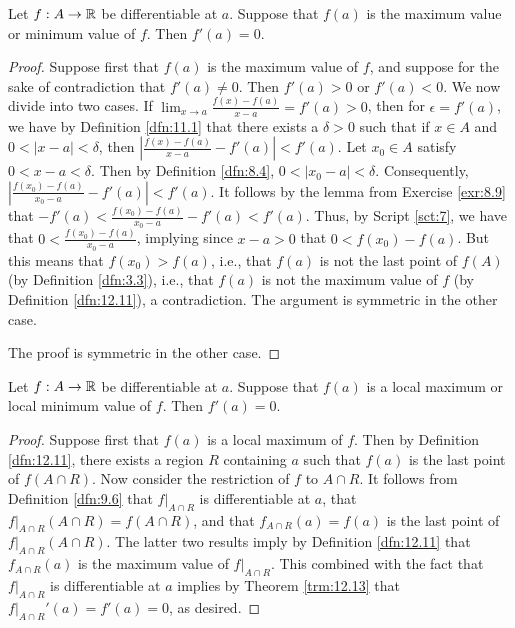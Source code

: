 \documentclass[../main.tex]{subfiles}
\begin{document}
\begin{theorem}\label{trm:12.13}
    Let $f:A\to\mathbb{R}$ be differentiable at $a$. Suppose that $f(a)$ is the maximum value or minimum value of $f$. Then $f'(a)=0$.
    \begin{proof}
        Suppose first that $f(a)$ is the maximum value of $f$, and suppose for the sake of contradiction that $f'(a)\neq 0$. Then $f'(a)>0$ or $f'(a)<0$. We now divide into two cases. If $\lim_{x\to a}\frac{f(x)-f(a)}{x-a}=f'(a)>0$, then for $\epsilon=f'(a)$, we have by Definition \ref{dfn:11.1} that there exists a $\delta>0$ such that if $x\in A$ and $0<|x-a|<\delta$, then $|\frac{f(x)-f(a)}{x-a}-f'(a)|<f'(a)$. Let $x_0\in A$ satisfy $0<x-a<\delta$. Then by Definition \ref{dfn:8.4}, $0<|x_0-a|<\delta$. Consequently, $|\frac{f(x_0)-f(a)}{x_0-a}-f'(a)|<f'(a)$. It follows by the lemma from Exercise \ref{exr:8.9} that $-f'(a)<\frac{f(x_0)-f(a)}{x_0-a}-f'(a)<f'(a)$. Thus, by Script \ref{sct:7}, we have that $0<\frac{f(x_0)-f(a)}{x_0-a}$, implying since $x-a>0$ that $0<f(x_0)-f(a)$. But this means that $f(x_0)>f(a)$, i.e., that $f(a)$ is not the last point of $f(A)$ (by Definition \ref{dfn:3.3}), i.e., that $f(a)$ is not the maximum value of $f$ (by Definition \ref{dfn:12.11}), a contradiction. The argument is symmetric in the other case.\par
        The proof is symmetric in the other case.
    \end{proof}
\end{theorem}

\begin{corollary}\label{cly:12.14}
    Let $f:A\to\mathbb{R}$ be differentiable at $a$. Suppose that $f(a)$ is a local maximum or local minimum value of $f$. Then $f'(a)=0$.
    \begin{proof}
        Suppose first that $f(a)$ is a local maximum of $f$. Then by Definition \ref{dfn:12.11}, there exists a region $R$ containing $a$ such that $f(a)$ is the last point of $f(A\cap R)$. Now consider the restriction of $f$ to $A\cap R$. It follows from Definition \ref{dfn:9.6} that $f|_{A\cap R}$ is differentiable at $a$, that $f|_{A\cap R}(A\cap R)=f(A\cap R)$, and that $f_{A\cap R}(a)=f(a)$ is the last point of $f|_{A\cap R}(A\cap R)$. The latter two results imply by Definition \ref{dfn:12.11} that $f_{A\cap R}(a)$ is the maximum value of $f|_{A\cap R}$. This combined with the fact that $f|_{A\cap R}$ is differentiable at $a$ implies by Theorem \ref{trm:12.13} that $f|_{A\cap R}'(a)=f'(a)=0$, as desired.
    \end{proof}
\end{corollary}
\end{document}

